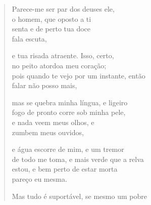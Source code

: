 \begin{verse}
Parece-me ser par dos deuses ele,\\
o homem, que oposto a ti\\
senta e de perto tua doce\\
fala escuta,\\

\medskip

e tua risada atraente. Isso, certo,\\
no peito atordoa meu coração;\\
pois quando te vejo por um instante, então\\
falar não posso mais,\\

\medskip

mas se quebra minha língua, e ligeiro\\
fogo de pronto corre sob minha pele,\\
e nada veem meus olhos, e\\
zumbem meus ouvidos,\\

\medskip

e água escorre de mim, e um tremor\\
de todo me toma, e mais verde que a relva\\
estou, e bem perto de estar morta\\
pareço eu mesma.\\

\medskip

Mas tudo é suportável, se mesmo um pobre 
\end{verse}

\medskip

